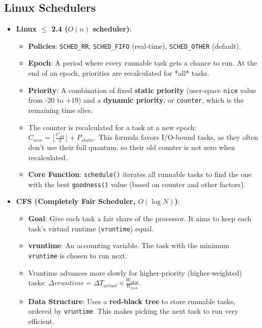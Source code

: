 \documentclass[8pt,a4paper]{article}
\begin{document}
\begin{multicols}{2}
\subsection*{Linux Schedulers}
\begin{itemize}
    \item \textbf{Linux $\le$ 2.4 ($O(n)$ scheduler)}:
    \begin{itemize}
        \item \textbf{Policies}: \texttt{SCHED\_RR}, \texttt{SCHED\_FIFO} (real-time), \texttt{SCHED\_OTHER} (default).
        \item \textbf{Epoch}: A period where every runnable task gets a chance to run. At the end of an epoch, priorities are recalculated for *all* tasks.
        \item \textbf{Priority}: A combination of fixed \textbf{static priority} (user-space \texttt{nice} value from -20 to +19) and a \textbf{dynamic priority}, or \texttt{counter}, which is the remaining time slice.
        \item The counter is recalculated for a task at a new epoch: $C_{new} = \lfloor \frac{C_{old}}{2} \rfloor + P_{static}$. This formula favors I/O-bound tasks, as they often don't use their full quantum, so their old counter is not zero when recalculated.
        \item \textbf{Core Function}: \texttt{schedule()} iterates all runnable tasks to find the one with the best \texttt{goodness()} value (based on counter and other factors).
    \end{itemize}
    \item \textbf{CFS (Completely Fair Scheduler, $O(\log N)$)}:
    \begin{itemize}
        \item \textbf{Goal}: Give each task a fair share of the processor. It aims to keep each task's virtual runtime (\texttt{vruntime}) equal.
        \item \textbf{vruntime}: An accounting variable. The task with the minimum \texttt{vruntime} is chosen to run next.
        \item Vruntime advances more slowly for higher-priority (higher-weighted) tasks: $\Delta vruntime = \Delta T_{actual} \times \frac{W_{ideal}}{W_{task}}$.
        \item \textbf{Data Structure}: Uses a \textbf{red-black tree} to store runnable tasks, ordered by \texttt{vruntime}. This makes picking the next task to run very efficient.
    \end{itemize}
\end{itemize}


\end{multicols}
\end{document}
